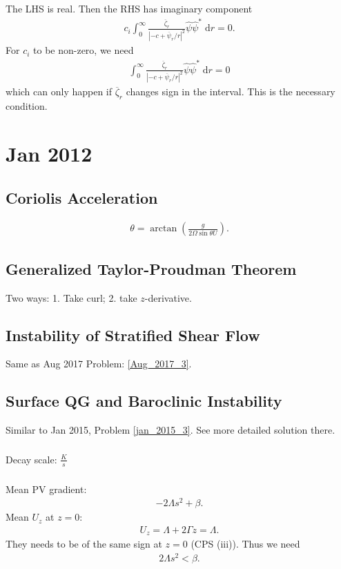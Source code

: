 \documentclass[11pt,letterpaper]{book}
\theoremstyle{definition}
\newcommand{\de}{\mathrm{d}}
\newcommand{\dsp}{\displaystyle}
\begin{document}
The LHS is real. Then the RHS has imaginary component
\begin{align*}
c_i\int^\infty_0\frac{\overline{\zeta}_r}{|-c+{\overline{\psi}_r}/r|^2}\hat{\psi}\hat{\psi}^*\;\de r = 0.
\end{align*}
For $c_i$ to be non-zero, we need
\begin{align*}
\int^\infty_0\frac{\overline{\zeta}_r}{|-c+{\overline{\psi}_r}/r|^2}\hat{\psi}\hat{\psi}^*\;\de r = 0
\end{align*}
which can only happen if $\overline{\zeta}_r$ changes sign in the interval. This is the necessary condition. 


\chapter{Jan 2012}
\section{Coriolis Acceleration}
\begin{align*}
\theta = \arctan\left( \frac{g}{2\Omega \sin\theta U} \right).
\end{align*}

\section{Generalized Taylor-Proudman Theorem}
Two ways: 1. Take curl; 2. take $z$-derivative.

\section{Instability of Stratified Shear Flow}
Same as Aug 2017 Problem: \ref{Aug_2017_3}.

\section{Surface QG and Baroclinic Instability}\label{jan_2012_4}
Similar to Jan 2015, Problem \ref{jan_2015_3}. See more detailed solution there.
\subsection{}
Decay scale: $\dsp{\frac{K}{s}}$

\subsection{}\label{jan_2012_4_2}
Mean PV gradient:
\begin{align*}
-2\Lambda s^2+\beta.
\end{align*}
Mean $U_z$ at $z=0$:
\begin{align*}
U_z = \Lambda+2\Gamma z = \Lambda.
\end{align*}
They needs to be of the same sign at $z=0$ (CPS (iii)). Thus we need
\begin{align*}
2\Lambda s^2<\beta.
\end{align*}
\end{document}
